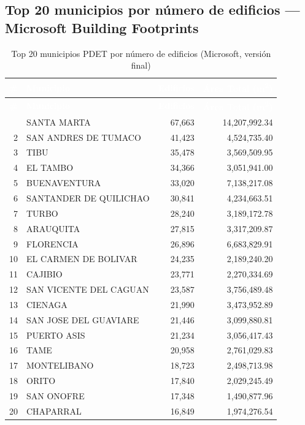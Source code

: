 \documentclass{article}
\newcommand{\tblhdr}[1]{%
  \cellcolor{azulclaro}\textbf{\textcolor{white}{#1}}%
}
\begin{document}
\subsection{Top 20 municipios por número de edificios — Microsoft Building Footprints}

\begin{longtable}{r l r r}
\caption{Top 20 municipios PDET por número de edificios (Microsoft, versión final)} \\
\toprule
\tblhdr{\#} & \tblhdr{Municipio} & \tblhdr{Edificios} & \tblhdr{Área Total (m\textsuperscript{2})} \\
\midrule
\endfirsthead
\toprule
\tblhdr{\#} & \tblhdr{Municipio} & \tblhdr{Edificios} & \tblhdr{Área Total (m\textsuperscript{2})} \\
\midrule
\endhead
\bottomrule
\endfoot
1  & SANTA MARTA              & 67,663 & 14,207,992.34 \\
\rowcolor{grisfilas}
2  & SAN ANDRES DE TUMACO     & 41,423 & 4,524,735.40 \\
3  & TIBU                     & 35,478 & 3,569,509.95 \\
\rowcolor{grisfilas}
4  & EL TAMBO                 & 34,366 & 3,051,941.00 \\
5  & BUENAVENTURA             & 33,020 & 7,138,217.08 \\
\rowcolor{grisfilas}
6  & SANTANDER DE QUILICHAO   & 30,841 & 4,234,663.51 \\
7  & TURBO                    & 28,240 & 3,189,172.78 \\
\rowcolor{grisfilas}
8  & ARAUQUITA                & 27,815 & 3,317,209.87 \\
9  & FLORENCIA                & 26,896 & 6,683,829.91 \\
\rowcolor{grisfilas}
10 & EL CARMEN DE BOLIVAR     & 24,235 & 2,189,240.20 \\
11 & CAJIBIO                  & 23,771 & 2,270,334.69 \\
\rowcolor{grisfilas}
12 & SAN VICENTE DEL CAGUAN   & 23,587 & 3,756,489.48 \\
13 & CIENAGA                  & 21,990 & 3,473,952.89 \\
\rowcolor{grisfilas}
14 & SAN JOSE DEL GUAVIARE    & 21,446 & 3,099,880.81 \\
15 & PUERTO ASIS              & 21,234 & 3,056,417.43 \\
\rowcolor{grisfilas}
16 & TAME                     & 20,958 & 2,761,029.83 \\
17 & MONTELIBANO              & 18,723 & 2,498,713.98 \\
\rowcolor{grisfilas}
18 & ORITO                    & 17,840 & 2,029,245.49 \\
19 & SAN ONOFRE               & 17,348 & 1,490,877.96 \\
\rowcolor{grisfilas}
20 & CHAPARRAL                & 16,849 & 1,974,276.54 \\
\end{longtable}
\end{document}
